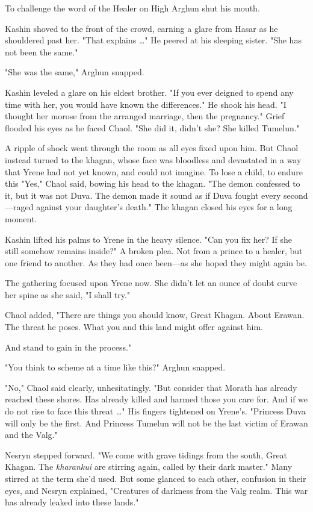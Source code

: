 To challenge the word of the Healer on High  Arghun shut his mouth.

Kashin shoved to the front of the crowd, earning a glare from Hasar as he shouldered past her. "That explains \ldots" He peered at his sleeping sister. "She has not been the same."

"She was the same," Arghun snapped.

Kashin leveled a glare on his eldest brother. "If you ever deigned to spend any time with her, you would have known the differences." He shook his head. "I thought her morose from the arranged marriage, then the pregnancy." Grief flooded his eyes as he faced Chaol. "She did it, didn't she? She killed Tumelun."

A ripple of shock went through the room as all eyes fixed upon him. But Chaol instead turned to the khagan, whose face was bloodless and devastated in a way that Yrene had not yet known, and could not imagine. To lose a child, to endure this  "Yes," Chaol said, bowing his head to the khagan. "The demon confessed to it, but it was not Duva. The demon made it sound as if Duva fought every second---raged against your daughter's death." The khagan closed his eyes for a long moment.

Kashin lifted his palms to Yrene in the heavy silence. "Can you fix her? If she still somehow remains inside?" A broken plea. Not from a prince to a healer, but one friend to another. As they had once been---as she hoped they might again be.

The gathering focused upon Yrene now. She didn't let an ounce of doubt curve her spine as she said, "I shall try."

Chaol added, "There are things you should know, Great Khagan. About Erawan. The threat he poses. What you and this land might offer against him.

And stand to gain in the process."

"You think to scheme at a time like this?" Arghun snapped.

"No," Chaol said clearly, unhesitatingly. "But consider that Morath has already reached these shores. Has already killed and harmed those you care for. And if we do not rise to face this threat \ldots" His fingers tightened on Yrene's. "Princess Duva will only be the first. And Princess Tumelun will not be the last victim of Erawan and the Valg."

Nesryn stepped forward. "We come with grave tidings from the south, Great Khagan. The \emph{kharankui} are stirring again, called by their dark  master." Many stirred at the term she'd used. But some glanced to each other, confusion in their eyes, and Nesryn explained, "Creatures of darkness from the Valg realm. This war has already leaked into these lands."

